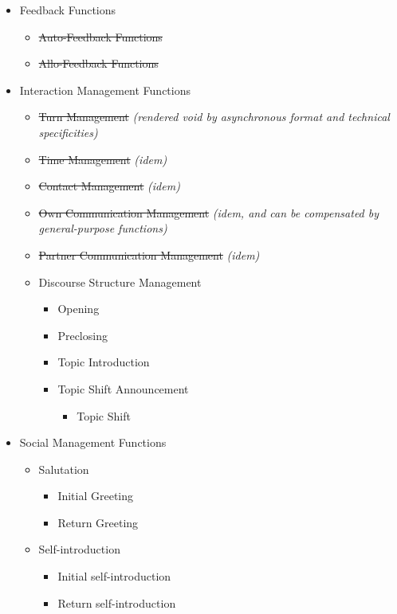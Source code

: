 \begin{itemize}
	\item Feedback Functions
		\begin{itemize}
			\item \sout{Auto-Feedback Functions}
			\item \sout{Allo-Feedback Functions}
		\end{itemize}
	\item Interaction Management Functions
		\begin{itemize}
			\item \sout{Turn Management} \textit{(rendered void by asynchronous format and technical specificities)}
			\item \sout{Time Management} \textit{(idem)}
			\item \sout{Contact Management} \textit{(idem)}
			\item \sout{Own Communication Management} \textit{(idem, and can be compensated by general-purpose functions)}
			\item \sout{Partner Communication Management} \textit{(idem)}
			\item Discourse Structure Management
				\begin{itemize}
					\item Opening
					\item Preclosing
					\item Topic Introduction
					\item Topic Shift Announcement
						\begin{itemize}
							\item Topic Shift
						\end{itemize}
				\end{itemize}
		\end{itemize}
	\item Social Management Functions
		\begin{itemize}
			\item Salutation
				\begin{itemize}
					\item Initial Greeting
					\item Return Greeting
				\end{itemize}
			\item Self-introduction
				\begin{itemize}
					\item Initial self-introduction
					\item Return self-introduction
				\end{itemize}

\end{itemize}
\end{itemize}
